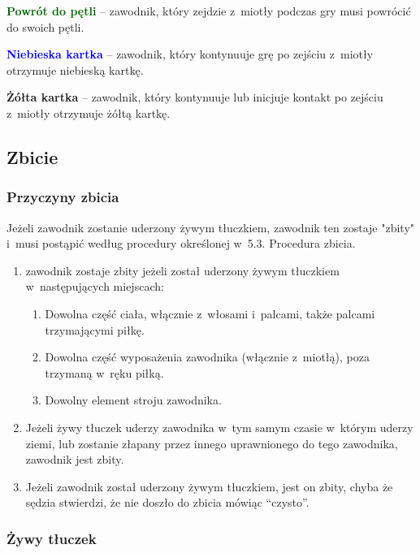 \documentclass[12pt]{article}
\newcommand\yellowcard[1]{\bgroup\textcolor{darkyellow}{\textbf{#1}}}
\newcommand\bluecard[1]{\bgroup\textcolor{blue}{\textbf{#1}}}
\newcommand\other[1]{\bgroup\textcolor{darkgreen}{\textbf{#1}}}
\begin{document}
\other{Powrót do pętli} -- zawodnik, który zejdzie z~miotły podczas gry
musi powrócić do swoich pętli.

\bluecard{Niebieska kartka} -- zawodnik, który kontynuuje grę po zejściu z~miotły otrzymuje niebieską kartkę.

\yellowcard{Żółta kartka} -- zawodnik, który kontynuuje lub inicjuje kontakt po
zejściu z~miotły otrzymuje żółtą kartkę.

\subsection{Zbicie}

\subsubsection{Przyczyny zbicia}

Jeżeli zawodnik zostanie uderzony żywym tłuczkiem, zawodnik ten zostaje
"zbity" i~musi postąpić
według procedury określonej w~5.3. Procedura zbicia.

\begin{enumerate}
	\item
	      zawodnik zostaje zbity jeżeli został uderzony żywym tłuczkiem w~następujących miejscach:

	      \begin{enumerate}
		      \item
		            Dowolna część ciała, włącznie z~włosami i~palcami, także palcami
		            trzymającymi piłkę.
		      \item
		            Dowolna część wyposażenia zawodnika (włącznie z~miotłą), poza
		            trzymaną w~ręku piłką.
		      \item
		            Dowolny element stroju zawodnika.
	      \end{enumerate}
	\item
	      Jeżeli żywy tłuczek uderzy zawodnika w~tym samym czasie w~którym
	      uderzy ziemi, lub zostanie złapany przez innego uprawnionego do tego
	      zawodnika, zawodnik jest zbity.
	\item
	      Jeżeli zawodnik został uderzony żywym tłuczkiem, jest on zbity, chyba
	      że sędzia stwierdzi, że nie doszło do zbicia mówiąc ``czysto''.
\end{enumerate}

\subsubsection{Żywy tłuczek}
\end{document}

